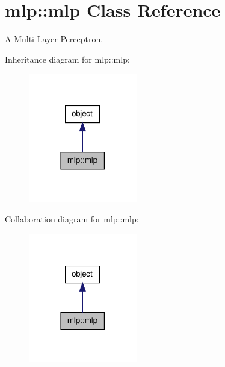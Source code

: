 \hypertarget{classmlp_1_1mlp}{
\section{mlp::mlp Class Reference}
\label{classmlp_1_1mlp}
}


A Multi-\/Layer Perceptron.  




Inheritance diagram for mlp::mlp:
\nopagebreak
\begin{figure}[H]
\begin{center}
\leavevmode
\includegraphics[width=134pt]{classmlp_1_1mlp__inherit__graph}
\end{center}
\end{figure}


Collaboration diagram for mlp::mlp:
\nopagebreak
\begin{figure}[H]
\begin{center}
\leavevmode
\includegraphics[width=134pt]{classmlp_1_1mlp__coll__graph}
\end{center}
\end{figure}
